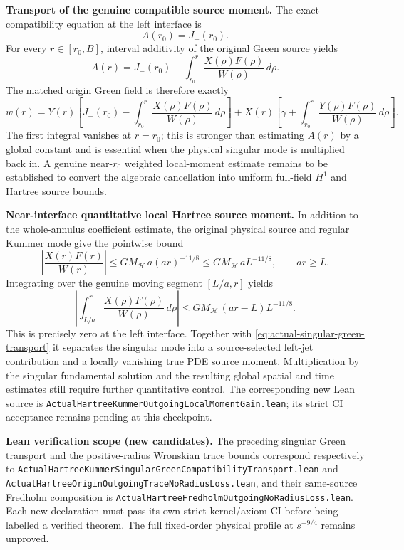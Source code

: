 \documentclass[11pt]{amsart}
\newcommand{\HH}{\mathcal H}
\begin{document}
\medskip
\noindent\textbf{Transport of the genuine compatible source moment.}
The exact compatibility equation at the left interface is
\[
 A(r_0)=J_-(r_0).
\]
For every $r\in[r_0,B]$, interval additivity of the original
Green source yields
\begin{equation}
 A(r)=J_-(r_0)-
  \int_{r_0}^{r}\frac{X(\rho)F(\rho)}{W(\rho)}\,d\rho.
 \label{eq:actual-singular-green-transport}
\end{equation}
The matched origin Green field is therefore exactly
\[
 w(r)
  =Y(r)\left[J_-(r_0)-
      \int_{r_0}^{r}\frac{X(\rho)F(\rho)}{W(\rho)}\,d\rho
    \right]
   +X(r)\left[\gamma+\int_{r_0}^{r}
      \frac{Y(\rho)F(\rho)}{W(\rho)}\,d\rho
     \right].
\]
The first integral vanishes at $r=r_0$; this is stronger than
estimating $A(r)$ by a global constant and is essential when
the physical singular mode is multiplied back in.
A genuine near-$r_0$ weighted local-moment estimate remains to be
established to convert the algebraic cancellation into uniform
full-field $H^1$ and Hartree source bounds.

\medskip
\noindent\textbf{Near-interface quantitative local Hartree source moment.}
In addition to the whole-annulus coefficient estimate, the original
physical source and regular Kummer mode give the pointwise bound
\[
 \left|\frac{X(r)F(r)}{W(r)}\right|
 \le GM_{\HH}\,a(ar)^{-11/8}
 \le GM_{\HH}\,aL^{-11/8},\qquad ar\ge L.
\]
Integrating over the genuine moving segment $[L/a,r]$ yields
\begin{equation}
 \left|\int_{L/a}^{r}
       \frac{X(\rho)F(\rho)}{W(\rho)}\,d\rho\right|
 \le GM_{\HH}\,(ar-L)L^{-11/8}.
 \label{eq:actual-local-hartree-green-moment}
\end{equation}
This is precisely zero at the left interface. Together with
\eqref{eq:actual-singular-green-transport} it separates the singular
mode into a source-selected left-jet contribution and a locally
vanishing true PDE source moment. Multiplication by the singular
fundamental solution and the resulting global spatial and time estimates
still require further quantitative control. The corresponding new
Lean source is
\texttt{ActualHartreeKummerOutgoingLocalMomentGain.lean};
its strict CI acceptance remains pending at this checkpoint.

\medskip
\noindent\textbf{Lean verification scope (new candidates).}
The preceding singular Green transport and the positive-radius
Wronskian trace bounds correspond respectively to
\texttt{ActualHartreeKummerSingularGreenCompatibilityTransport.lean}
and
\texttt{ActualHartreeOriginOutgoingTraceNoRadiusLoss.lean},
and their same-source Fredholm composition is
\texttt{ActualHartreeFredholmOutgoingNoRadiusLoss.lean}.
Each new declaration must pass its own strict kernel/axiom CI before
being labelled a verified theorem. The full fixed-order
physical profile at $s^{-9/4}$ remains unproved.
\end{document}
